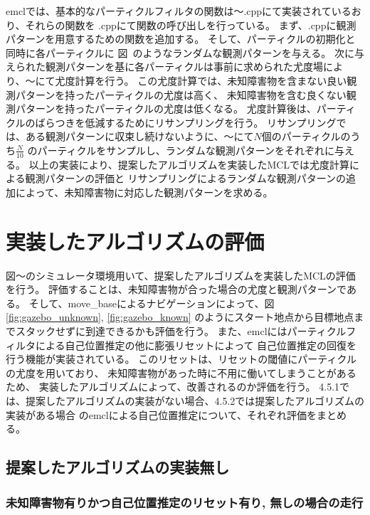 emclでは、基本的なパーティクルフィルタの関数は〜.cppにて実装されているおり、それらの関数を
.cppにて関数の呼び出しを行っている。
まず、.cppに観測パターンを用意するための関数を追加する。
そして、パーティクルの初期化と同時に各パーティクルに
図~のようなランダムな観測パターンを与える。
次に与えられた観測パターンを基に各パーティクルは事前に求められた尤度場により、〜にて尤度計算を行う。
この尤度計算では、未知障害物を含まない良い観測パターンを持ったパーティクルの尤度は高く、
未知障害物を含む良くない観測パターンを持ったパーティクルの尤度は低くなる。
尤度計算後は、パーティクルのばらつきを低減するためにリサンプリングを行う。
リサンプリングでは、ある観測パターンに収束し続けないように、〜にて$N$個のパーティクルのうち$\frac{N}{10}$
のパーティクルをサンプルし、ランダムな観測パターンをそれぞれに与える。
以上の実装により、提案したアルゴリズムを実装したMCLでは尤度計算による観測パターンの評価と
リサンプリングによるランダムな観測パターンの追加によって、未知障害物に対応した観測パターンを求める。

\section{実装したアルゴリズムの評価}

図〜のシミュレータ環境用いて、提案したアルゴリズムを実装したMCLの評価を行う。
評価することは、未知障害物が合った場合の尤度と観測パターンである。
そして、move\_baseによるナビゲーションによって、図\ref{fig:gazebo_unknown}, \ref{fig:gazebo_known}
のようにスタート地点から目標地点までスタックせずに到達できるかも評価を行う。
また、emclにはパーティクルフィルタによる自己位置推定の他に膨張リセットによって
自己位置推定の回復を行う機能が実装されている。
このリセットは、リセットの閾値にパーティクルの尤度を用いており、
未知障害物があった時に不用に働いてしまうことがあるため、
実装したアルゴリズムによって、改善されるのか評価を行う。
4.5.1では、提案したアルゴリズムの実装がない場合、4.5.2では提案したアルゴリズムの実装がある場合
のemclによる自己位置推定について、それぞれ評価をまとめる。

\subsection{提案したアルゴリズムの実装無し}

\subsubsection{未知障害物有りかつ自己位置推定のリセット有り, 無しの場合の走行}

